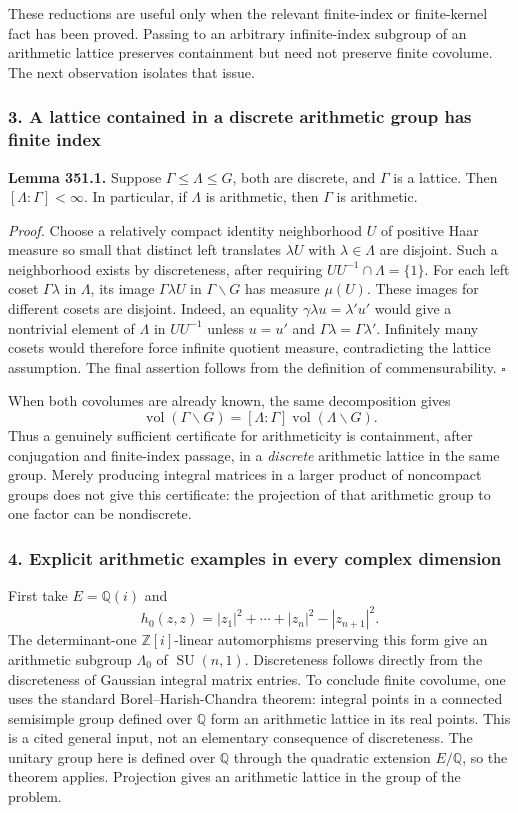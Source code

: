 \documentclass[11pt]{article}
\begin{document}
These reductions are useful only when the relevant finite-index or finite-kernel fact has been proved. Passing to an arbitrary infinite-index subgroup of an arithmetic lattice preserves containment but need not preserve finite covolume. The next observation isolates that issue.

\subsubsection{3. A lattice contained in a discrete arithmetic group has finite index}
\textbf{Lemma 351.1.} Suppose $\Gamma\le\Lambda\le G$, both are discrete, and $\Gamma$ is a lattice. Then $[\Lambda:\Gamma]<\infty$. In particular, if $\Lambda$ is arithmetic, then $\Gamma$ is arithmetic.

\emph{Proof.} Choose a relatively compact identity neighborhood $U$ of positive Haar measure so small that distinct left translates $\lambda U$ with $\lambda\in\Lambda$ are disjoint. Such a neighborhood exists by discreteness, after requiring $UU^{-1}\cap\Lambda=\{1\}$. For each left coset $\Gamma\lambda$ in $\Lambda$, its image $\Gamma\lambda U$ in $\Gamma\backslash G$ has measure $\mu(U)$. These images for different cosets are disjoint. Indeed, an equality $\gamma\lambda u=\lambda' u'$ would give a nontrivial element of $\Lambda$ in $UU^{-1}$ unless $u=u'$ and $\Gamma\lambda=\Gamma\lambda'$. Infinitely many cosets would therefore force infinite quotient measure, contradicting the lattice assumption. The final assertion follows from the definition of commensurability. $\square$

When both covolumes are already known, the same decomposition gives
\[
 \operatorname{vol}(\Gamma\backslash G)
  =[\Lambda:\Gamma]\operatorname{vol}(\Lambda\backslash G).
 \tag{351.3}
\]
Thus a genuinely sufficient certificate for arithmeticity is containment, after conjugation and finite-index passage, in a \emph{discrete} arithmetic lattice in the same group. Merely producing integral matrices in a larger product of noncompact groups does not give this certificate: the projection of that arithmetic group to one factor can be nondiscrete.

\subsubsection{4. Explicit arithmetic examples in every complex dimension}
First take $E=\mathbb Q(i)$ and
\[
 h_0(z,z)=|z_1|^2+\cdots+|z_n|^2-|z_{n+1}|^2.
\]
The determinant-one $\mathbb Z[i]$-linear automorphisms preserving this form give an arithmetic subgroup $\Lambda_0$ of $\operatorname{SU}(n,1)$. Discreteness follows directly from the discreteness of Gaussian integral matrix entries. To conclude finite covolume, one uses the standard Borel--Harish-Chandra theorem: integral points in a connected semisimple group defined over $\mathbb Q$ form an arithmetic lattice in its real points. This is a cited general input, not an elementary consequence of discreteness. The unitary group here is defined over $\mathbb Q$ through the quadratic extension $E/\mathbb Q$, so the theorem applies. Projection gives an arithmetic lattice in the group of the problem.
\end{document}
